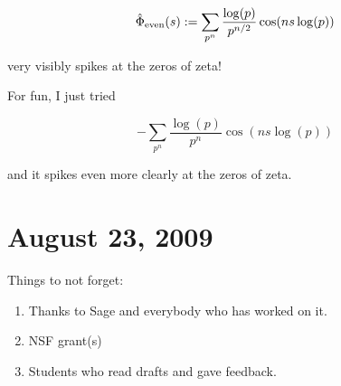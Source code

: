 \documentclass{article}
\begin{document}
$${\hat \Phi}_{\rm even}(s): = \sum_{p^n} {\frac{\log(p)}{p^{n/2}}}\cos(ns \log(p))$$ 

very visibly spikes at the zeros of zeta!

For fun, I just tried 

$$-\sum_{p^n} {\frac{\log(p)}{p^n}}\cos(ns \log(p))$$ 

and it spikes even more clearly at the zeros of zeta. 

\section{August 23, 2009}

Things to not forget:
\begin{enumerate}
\item Thanks to Sage and everybody who has worked on it.
\item NSF grant(s)
\item Students who read drafts and gave feedback. 
\end{enumerate}
\end{document}
